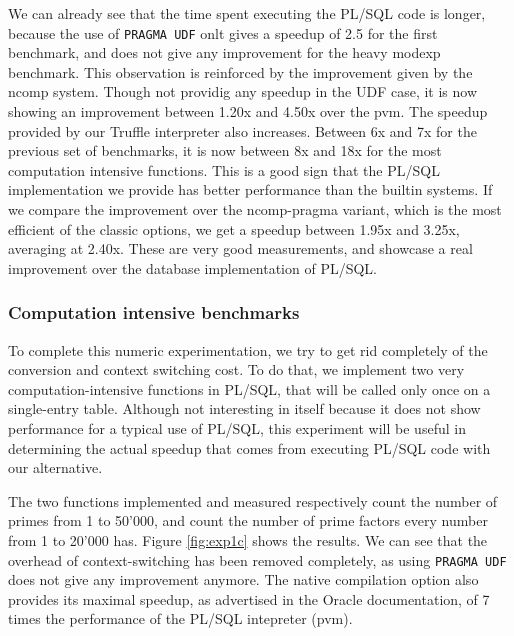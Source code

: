 \documentclass[twoside,11pt,a4paper]{article}
\newcommand{\pls}[1]{\small\texttt{#1}\normalsize}
\newcommand{\plstype}[1]{\pls{#1}}
\newcommand{\simpleint}{\plstype{SIMPLE\_INTEGER}}
\newcommand{\benchsystem}[1]{\textsf{#1}}
\newcommand{\pvm}{\benchsystem{pvm}}
\newcommand{\ncomp}{\benchsystem{ncomp}}
\newcommand{\ncpg}{\benchsystem{ncomp-pragma}}
\newcommand{\bench}[1]{\textsf{#1}}
\begin{document}
We can already see that the time spent executing the PL/SQL code is longer, because the use of \pls{PRAGMA UDF} onlt gives a speedup of 2.5 for the first benchmark, and does not give any improvement for the heavy \bench{modexp} benchmark. This observation is reinforced by the improvement given by the \ncomp{} system. Though not providig any speedup in the UDF case, it is now showing an improvement between 1.20x and 4.50x  over the \pvm{}. The speedup provided by our Truffle interpreter also increases. Between 6x and 7x for the previous set of benchmarks, it is now between 8x and 18x for the most computation intensive functions. This is a good sign that the PL/SQL implementation we provide has better performance than the builtin systems. If we compare the improvement over the \ncpg{} variant, which is the most efficient of the classic options, we get a speedup between 1.95x and 3.25x, averaging at 2.40x. These are very good measurements, and showcase a real improvement over the database implementation of PL/SQL.

\subsubsection{Computation intensive benchmarks}

To complete this numeric experimentation, we try to get rid completely of the conversion and context switching cost. To do that, we implement two very computation-intensive functions in PL/SQL, that will be called only once on a single-entry table. Although not interesting in itself because it does not show performance for a typical use of PL/SQL, this experiment will be useful in determining the actual speedup that comes from executing PL/SQL code with our alternative.


The two functions implemented and measured respectively count the number of primes from 1 to 50'000, and count the number of prime factors every number from 1 to 20'000 has. Figure \ref{fig:exp1c} shows the results. We can see that the overhead of context-switching has been removed completely, as using \pls{PRAGMA UDF} does not give any improvement anymore. The native compilation option also provides its maximal speedup, as advertised in the Oracle documentation, of 7 times the performance of the PL/SQL intepreter (\pvm{}).
\end{document}
